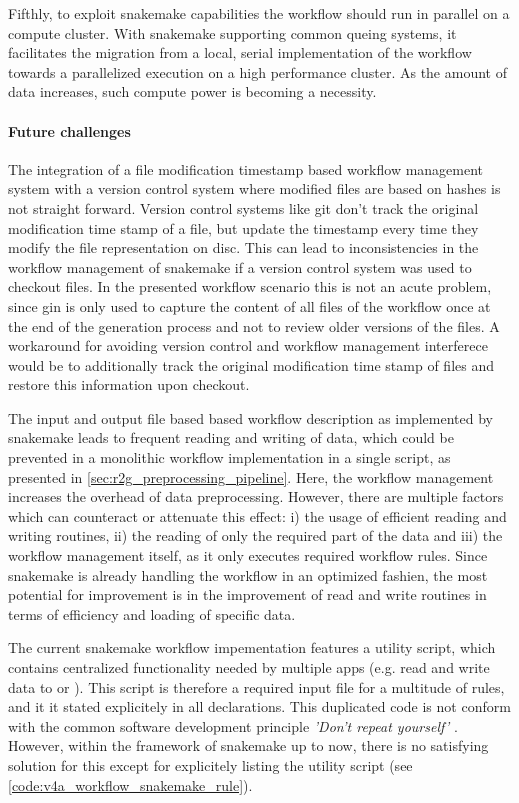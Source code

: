 Fifthly, to exploit snakemake capabilities the workflow should run in parallel on a compute cluster. With snakemake supporting common queing systems, it facilitates the migration from a local, serial implementation of the workflow towards a parallelized execution on a high performance cluster. As the amount of data increases, such compute power is becoming a necessity.

\paragraph{Future challenges}
The integration of a file modification timestamp based workflow management system with a version control system where modified files are based on hashes is not straight forward. Version control systems like git don't track the original modification time stamp of a file, but update the timestamp every time they modify the file representation on disc. This can lead to inconsistencies in the workflow management of snakemake if a version control system was used to checkout files. In the presented workflow scenario this is not an acute problem, since gin is only used to capture the content of all files of the workflow once at the end of the generation process and not to review older versions of the files. A workaround for avoiding version control and workflow management interferece would be to additionally track the original modification time stamp of files and restore this information upon checkout.

The input and output file based based workflow description as implemented by snakemake leads to frequent reading and writing of data, which could be prevented in a monolithic workflow implementation in a single script, as presented in \cref{sec:r2g_preprocessing_pipeline}. Here, the workflow management increases the overhead of data preprocessing. However, there are multiple factors which can counteract or attenuate this effect: i) the usage of efficient reading and writing routines, ii) the reading of only the required part of the data and iii) the workflow management itself, as it only executes required workflow rules. Since snakemake is already handling the workflow in an optimized fashien, the most potential for improvement is in the improvement of read and write routines in terms of efficiency and loading of specific data. 

The current snakemake workflow impementation features a utility script, which contains centralized functionality needed by multiple apps (e.g. read and write data to  or ). This script is therefore a required input file for a multitude of rules, and it it stated explicitely in all  declarations. This duplicated code is not conform with the common software development principle \textit{'Don't repeat yourself'} \citep{Martin_2008}. However, within the framework of snakemake up to now, there is no satisfying solution for this except for explicitely listing the utility script (see \cref{code:v4a_workflow_snakemake_rule}). 

